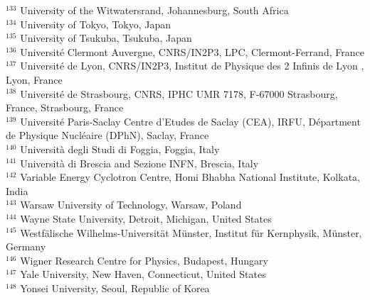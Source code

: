 \begin{flushleft}
$^{133}$ University of the Witwatersrand, Johannesburg, South Africa\\
$^{134}$ University of Tokyo, Tokyo, Japan\\
$^{135}$ University of Tsukuba, Tsukuba, Japan\\
$^{136}$ Universit\'{e} Clermont Auvergne, CNRS/IN2P3, LPC, Clermont-Ferrand, France\\
$^{137}$ Universit\'{e} de Lyon, CNRS/IN2P3, Institut de Physique des 2 Infinis de Lyon , Lyon, France\\
$^{138}$ Universit\'{e} de Strasbourg, CNRS, IPHC UMR 7178, F-67000 Strasbourg, France, Strasbourg, France\\
$^{139}$ Universit\'{e} Paris-Saclay Centre d'Etudes de Saclay (CEA), IRFU, D\'{e}partment de Physique Nucl\'{e}aire (DPhN), Saclay, France\\
$^{140}$ Universit\`{a} degli Studi di Foggia, Foggia, Italy\\
$^{141}$ Universit\`{a} di Brescia and Sezione INFN, Brescia, Italy\\
$^{142}$ Variable Energy Cyclotron Centre, Homi Bhabha National Institute, Kolkata, India\\
$^{143}$ Warsaw University of Technology, Warsaw, Poland\\
$^{144}$ Wayne State University, Detroit, Michigan, United States\\
$^{145}$ Westf\"{a}lische Wilhelms-Universit\"{a}t M\"{u}nster, Institut f\"{u}r Kernphysik, M\"{u}nster, Germany\\
$^{146}$ Wigner Research Centre for Physics, Budapest, Hungary\\
$^{147}$ Yale University, New Haven, Connecticut, United States\\
$^{148}$ Yonsei University, Seoul, Republic of Korea\\


\bigskip 

\end{flushleft} 
\endgroup